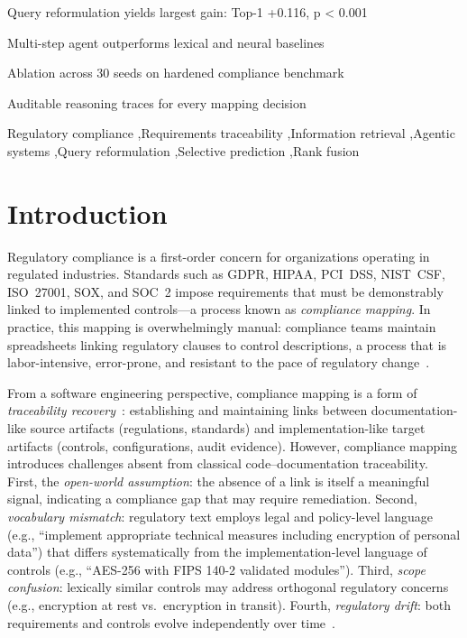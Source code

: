 \documentclass[a4paper,fleqn]{cas-sc}
\begin{document}
\begin{highlights}
\item Query reformulation yields largest gain: Top-1 +0.116, p < 0.001
\item Multi-step agent outperforms lexical and neural baselines
\item Ablation across 30 seeds on hardened compliance benchmark
\item Auditable reasoning traces for every mapping decision
\end{highlights}

\begin{keywords}
Regulatory compliance \sep Requirements traceability \sep Information retrieval \sep Agentic systems \sep Query reformulation \sep Selective prediction \sep Rank fusion
\end{keywords}

\maketitle


\section{Introduction}
\label{sec:intro}

Regulatory compliance is a first-order concern for organizations operating in regulated industries.
Standards such as GDPR, HIPAA, PCI~DSS, NIST~CSF, ISO~27001, SOX, and SOC~2 impose requirements that must be demonstrably linked to implemented controls---a process known as \emph{compliance mapping}.
In practice, this mapping is overwhelmingly manual: compliance teams maintain spreadsheets linking regulatory clauses to control descriptions, a process that is labor-intensive, error-prone, and resistant to the pace of regulatory change~\citep{Breaux2008}.

From a software engineering perspective, compliance mapping is a form of \emph{traceability recovery}~\citep{Borg2014,Cleland-Huang2014}: establishing and maintaining links between documentation-like source artifacts (regulations, standards) and implementation-like target artifacts (controls, configurations, audit evidence).
However, compliance mapping introduces challenges absent from classical code--documentation traceability.
First, the \emph{open-world assumption}: the absence of a link is itself a meaningful signal, indicating a compliance gap that may require remediation.
Second, \emph{vocabulary mismatch}: regulatory text employs legal and policy-level language (e.g., ``implement appropriate technical measures including encryption of personal data'') that differs systematically from the implementation-level language of controls (e.g., ``AES-256 with FIPS 140-2 validated modules'').
Third, \emph{scope confusion}: lexically similar controls may address orthogonal regulatory concerns (e.g., encryption at rest vs.\ encryption in transit).
Fourth, \emph{regulatory drift}: both requirements and controls evolve independently over time~\citep{Gama2014}.
\end{document}
